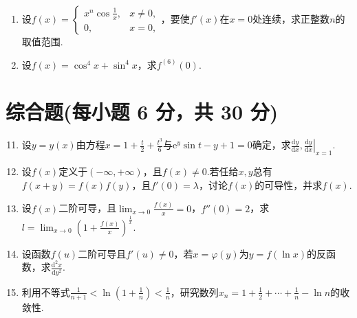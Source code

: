 \documentclass[../Main.tex]{subfiles}
\begin{document}
\begin{enumerate}
    \item 设$f(x)=
              \begin{cases}
                  x^{n} \cos\frac{1}{x}, & x\neq0, \\
                  0,                     & x=0,
              \end{cases}$，要使$f'(x)$在$x=0$处连续，求正整数$n$的取值范围.
          \vspace{10em}

    \item 设$f(x)=\cos^{4} x+\sin^{4} x$，求$f^{(6)}(0)$.
          \vspace{10em}
\end{enumerate}

\section{综合题(每小题 6 分，共 30 分)}
\begin{enumerate}
    \setcounter{enumi}{10}
    \item 设$y=y(x)$由方程$x=1+\frac{t}{2}+\frac{t^{3}}{6}$与$\mathrm{e}^{y}
              \sin t-y+1=0$确定，求$\frac{\mathrm{d}y}{\mathrm{d}x},\left.\frac{\mathrm{d}y}{\mathrm{d}x}
              \right|_{x=1}$.
          \vspace{13em}

    \item 设$f(x)$定义于$(-\infty,+\infty)$，且$f(x)\neq0$.若任给$x,y$总有$f
              (x+y)=f(x)f(y)$，且$f'(0)=\lambda$，讨论$f(x)$的可导性，并求$f(x)$.
          \vspace{13em}

    \item 设$f(x)$二阶可导，且$\lim_{x\to0}\frac{f(x)}{x}=0$，$f''(0)=2$，求$l
              =\lim_{x\to0}\left(1+\frac{f(x)}{x}\right)^{\frac{1}{x}}$.
          \vspace{8em}

    \item 设函数$f(u)$二阶可导且$f'(u)\neq0$，若$x=\varphi(y)$为$y=f(\ln x)$的反函数，求$\frac{\mathrm{d}^{2}
                  x}{\mathrm{d}y^{2}}$.
          \vspace{8em}

    \item 利用不等式$\frac{1}{n+1}<\ln\left(1+\frac{1}{n}\right)<\frac{1}{n}$，研究数列$x
                  _{n}=1+\frac{1}{2}+\cdots+\frac{1}{n}-\ln n$的收敛性.
          \vspace{8em}
\end{enumerate}
\end{document}
